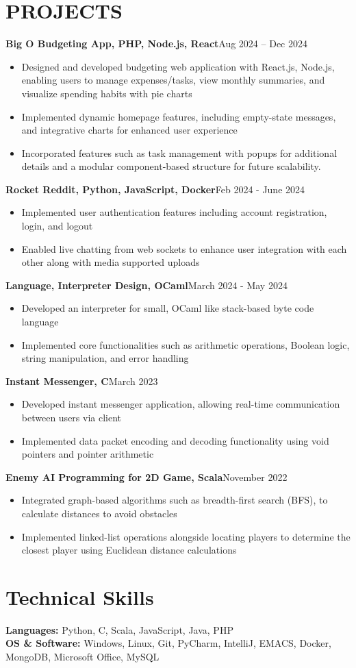 \documentclass[11pt,letterpaper]{article}
\newcommand{\jobtitle}[2]{%
  \noindent\textbf{#1}\hfill{#2}\par
}
\begin{document}
\section*{PROJECTS}
\jobtitle{Big O Budgeting App, PHP, Node.js, React}{Aug 2024 – Dec 2024}
\begin{itemize}
    \item Designed and developed budgeting web application with React.js, Node.js, enabling users to manage expenses/tasks, view monthly summaries, and visualize spending habits with pie charts
    \item Implemented dynamic homepage features, including empty-state messages, and integrative charts for enhanced user experience
    \item Incorporated features such as task management with popups for additional details and a modular component-based structure for future scalability.
\end{itemize}

\jobtitle{Rocket Reddit, Python, JavaScript, Docker}{Feb 2024 - June 2024}
\begin{itemize}
    \item Implemented user authentication features including account registration, login, and logout
    \item Enabled live chatting from web sockets to enhance user integration with each other along with media supported uploads
\end{itemize}

\jobtitle{Language, Interpreter Design, OCaml}{March 2024 - May 2024}
\begin{itemize}
    \item Developed an interpreter for small, OCaml like stack-based byte code language
    \item Implemented core functionalities such as arithmetic operations, Boolean logic, string manipulation, and error handling
\end{itemize}

\jobtitle{Instant Messenger, C}{March 2023}
\begin{itemize}
    \item Developed instant messenger application, allowing real-time communication between users via client
    \item Implemented data packet encoding and decoding functionality using void pointers and pointer arithmetic
\end{itemize}

\jobtitle{Enemy AI Programming for 2D Game, Scala}{November 2022}
\begin{itemize}
    \item Integrated graph-based algorithms such as breadth-first search (BFS), to calculate distances to avoid obstacles
    \item Implemented linked-list operations alongside locating players to determine the closest player using Euclidean distance calculations
\end{itemize}

\section*{Technical Skills}
\textbf{Languages:} Python, C, Scala, JavaScript, Java, PHP\\
\textbf{OS \& Software:} Windows, Linux, Git, PyCharm, IntelliJ, EMACS, Docker, MongoDB, Microsoft Office, MySQL
\end{document}
